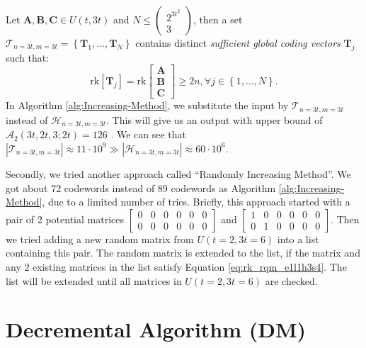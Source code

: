 \begin{defn}
 Let $\boldsymbol{A},\boldsymbol{B},\boldsymbol{C}\in U(t,3t)$ and
$N\leq\left(\begin{array}{c}
2^{3t^{2}}\\
3
\end{array}\right)$, then a set $\mathcal{T}_{n=3t,m=3t}=\left\{ \boldsymbol{T}_{1},\ldots,\boldsymbol{T}_{N}\right\} $
contains distinct \textit{sufficient global coding vectors} $\boldsymbol{T}_{j}$
such that:
\[
\mathrm{rk}\left[\boldsymbol{T}_{j}\right]=\mathrm{rk}\left[\begin{array}{c}
\boldsymbol{A}\\
\boldsymbol{B}\\
\boldsymbol{C}
\end{array}\right]\geq2n,\forall j\in\left\{ 1,\ldots,N\right\} .
\]
In Algorithm \ref{alg:Increasing-Method}, we substitute the input
by $\mathcal{T}_{n=3t,m=3t}$ instead of $\mathcal{H}_{n=3t,m=3t}$.
This will give us an output with upper bound of $\mathcal{A}_{2}\left(3t,2t,3;2t\right)=126$
\cite[Sec. V-B]{Zhang:2019}. We can see that $\left|\mathcal{T}_{n=3t,m=3t}\right|\approx11\cdot10^{9}\gg\left|\mathcal{H}_{n=3t,m=3t}\right|\approx60\cdot10^{6}$.
\end{defn}
Secondly, we tried another approach called ``Randomly Increasing
Method''. We got about 72 codewords instead of 89 codewords as Algorithm
\ref{alg:Increasing-Method}, due to a limited number of tries. Briefly,
this approach started with a pair of 2 potential matrices $\left[\begin{array}{cccccc}
0 & 0 & 0 & 0 & 0 & 0\\
0 & 0 & 0 & 0 & 0 & 0
\end{array}\right]$ and $\left[\begin{array}{cccccc}
1 & 0 & 0 & 0 & 0 & 0\\
0 & 1 & 0 & 0 & 0 & 0
\end{array}\right]$. Then we tried adding a new random matrix from $U\left(t=2,3t=6\right)$
into a list containing this pair. The random matrix is extended to
the list, if the matrix and any 2 existing matrices in the list satisfy
Equation \ref{eq:rk_rqm_e1l1h3s4}. The list will be extended until
all matrices in $U\left(t=2,3t=6\right)$ are checked.

\section{Decremental Algorithm (DM) \label{sec:Alternative-Approaches}}

